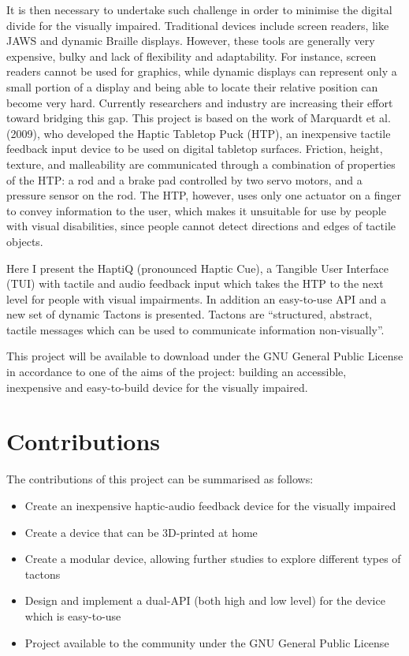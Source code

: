 It is then necessary to undertake such challenge in order to minimise the digital divide for the visually impaired. Traditional devices include screen readers, like JAWS\cite{JAWS} and dynamic Braille displays\cite{HumanWare, shimada2010development, blindMaps}. However, these tools are generally very expensive, bulky and lack of flexibility and adaptability. For instance, screen readers cannot be used for graphics, while dynamic displays can represent only a small portion of a display and being able to locate their relative position can become very hard.
Currently researchers and industry are increasing their effort toward bridging this gap. This project is based on the work of Marquardt et al.(2009)\nocite{marquardt2009haptic}, who developed the Haptic Tabletop Puck (HTP), an inexpensive tactile feedback input device to be used on digital tabletop surfaces. Friction, height, texture, and malleability are communicated through a combination of properties of the HTP: a rod and a brake pad controlled by two servo motors, and a pressure sensor on the rod. The HTP, however, uses only one actuator on a finger to convey information to the user, which makes it unsuitable for use by people with visual disabilities, since people cannot detect directions and edges of tactile objects. \par

Here I present the HaptiQ (pronounced Haptic Cue), a Tangible User Interface (TUI)\cite{ishii1997tangible} with tactile and audio feedback input which takes the HTP to the next level for people with visual impairments. In addition an easy-to-use API and a new set of dynamic Tactons is presented. Tactons are ``structured, abstract, tactile messages which can be used to communicate information non-visually''\cite{brown2005first}.\par
This project will be available to download under the GNU General Public License in accordance to one of the aims of the project: building an accessible, inexpensive and easy-to-build device for the visually impaired. \par

\section{Contributions}

The contributions of this project can be summarised as follows:
\begin{itemize}
	\item Create an inexpensive haptic-audio feedback device for the visually impaired
    \item Create a device that can be 3D-printed at home
    \item Create a modular device, allowing further studies to explore different types of tactons
    \item Design and implement a dual-API (both high and low level) for the device which is easy-to-use
    \item Project available to the community under the GNU General Public License 
\end{itemize}

